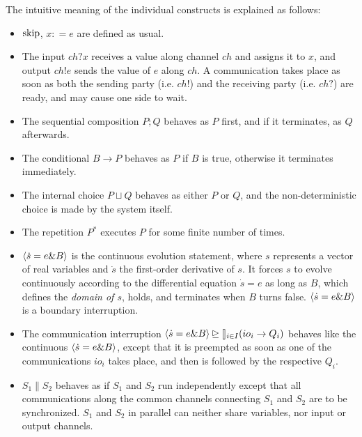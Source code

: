 \documentclass{llncs}
\begin{document}
The intuitive meaning of the individual constructs is explained as follows:
\begin{itemize}
 \item $\textmd{skip}$, $x: = e$ are defined as usual.
 \item The input $ch?x$ receives a value along channel $ch$ and assigns it to $x$, and output $ch!e$ sends the value of $e$ along $ch$.
 A communication takes place as soon as both the sending party (i.e. $ch!$) and the receiving party (i.e. $ch?$) are ready, and may cause one side to wait.
 \item The sequential composition $P; Q$ behaves as $P$ first, and if it terminates, as $Q$ afterwards.
 \item The conditional $B \rightarrow P$ behaves as $P$ if $B$ is true, otherwise it terminates immediately.
 \item The internal choice $P \sqcup Q$ behaves as either $P$ or $Q$, and the non-deterministic choice is made by the system itself.
 \item The repetition $P^*$ executes $P$ for some finite number of times.
 \item $\langle \dot{s}=e\& B\rangle$ is the continuous
 evolution statement, where $s$ represents a vector of real variables and $\dot{s}$ the first-order derivative of $s$.
 It forces  $s$  to evolve continuously according to  the differential equation  $\dot{s}=e$ as long
 as $B$, which defines the {\em domain of $s$}, holds, and terminates when $B$ turns false. $\langle \dot{s}=e\& B\rangle$ is a boundary interruption.
 \item The communication interruption $\langle \dot{s}=e\& B\rangle \unrhd \talloblong_{i\in I} (io_i \rightarrow Q_i)$ behaves like the continuous $\langle \dot{s}=e\& B\rangle$, except that it is preempted as soon as one of the communications $io_i$ takes place, and then is followed by the respective $Q_i$.
 \item $S_1\|S_2$ behaves as if $S_1$ and $S_2$ run independently except that all communications along the common channels connecting $S_1$ and $S_2$ are to be synchronized. $S_1$ and $S_2$ in parallel can neither share variables, nor input or output channels.
\end{itemize}
 
\end{document}
